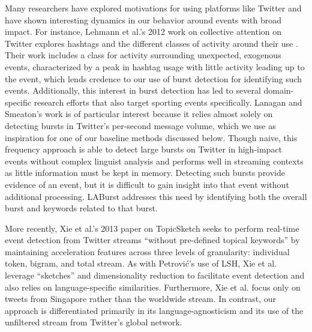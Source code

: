 \documentclass[letterpaper]{article}
\begin{document}
Many researchers have explored motivations for using platforms like Twitter and have shown interesting dynamics in our behavior around events with broad impact.
For instance, Lehmann et al.'s 2012 work on collective attention on Twitter explores hashtags and the different classes of activity around their use \cite{Lehmann:2012:DCC:2187836.2187871}.
Their work includes a class for activity surrounding unexpected, exogenous events, characterized by a peak in hashtag usage with little activity leading up to the event, which lends credence to our use of burst detection for identifying such events.
Additionally, this interest in burst detection has led to several domain-specific research efforts that also target sporting events specifically\cite{vasudevan2013twitter,Zhao2011,lanagan2011using}.
Lanagan and Smeaton's work is of particular interest because it relies almost solely on detecting bursts in Twitter's per-second message volume, which we use as inspiration for one of our baseline methods discussed below.
Though naive, this frequency approach is able to detect large bursts on Twitter in high-impact events  without complex linguist analysis and performs well in streaming contexts as little information must be kept in memory.
Detecting such bursts provide evidence of an event, but it is difficult to gain insight into that event  without additional processing.
LABurst addresses this need by identifying both the overall burst and keywords related to that burst.

More recently, Xie et al.'s 2013 paper on TopicSketch seeks to perform real-time event detection from Twitter streams ``without pre-defined topical keywords'' by maintaining acceleration features across three levels of granularity: individual token, bigram, and total stream.
As with Petrovi\'{c}'s use of LSH, Xie et al. leverage ``sketches'' and dimensionality reduction to facilitate event detection and also relies on language-specific similarities.
Furthermore, Xie et al. focus only on tweets from Singapore rather than the worldwide stream.
In contrast, our approach is differentiated primarily in its language-agnosticism and its use of the unfiltered stream from Twitter's global network.
\end{document}
